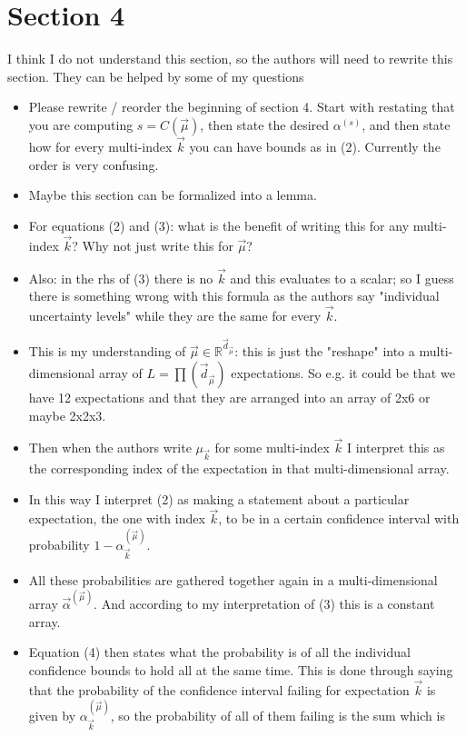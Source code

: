 \documentclass{article}[12pt]
\newcommand{\RefereeTODO}[1]{{\color{red} #1 \newline}}
\begin{document}
\section*{Section 4}

\RefereeTODO{I think I do not understand this section, so the authors will need to rewrite
this section. They can be helped by some of my questions}

\begin{itemize}
    \item \RefereeTODO{Please rewrite / reorder the beginning of section 4. Start with restating that you are computing $s = C(\vec{\mu})$, then state the desired $\alpha^{(s)}$, and then state how for every multi-index $\vec{k}$ you can have bounds as in (2). Currently the order is very confusing.}
    \item \RefereeTODO{Maybe this section can be formalized into a lemma.}
    \item \RefereeTODO{For equations (2) and (3): what is the benefit of writing this for any multi-index $\vec{k}$? Why not just write this for $\vec{\mu}$?}
    \item \RefereeTODO{Also: in the rhs of (3) there is no $\vec{k}$ and this evaluates to a scalar; so I guess there is something wrong with this formula as the authors say "individual uncertainty levels" while they are the same for every $\vec{k}$.}
    \item \RefereeTODO{This is my understanding of $\vec{\mu} \in \mathbb{R}^{\vec{d}_{\vec{\mu}}}$: this is just the "reshape" into a multi-dimensional array of $L = \prod(\vec{d}_{\vec{\mu}})$ expectations. So e.g. it could be that we have 12 expectations and that they are arranged into an array of 2x6 or maybe 2x2x3.}
    \item \RefereeTODO{Then when the authors write $\mu_{\vec{k}}$ for some multi-index $\vec{k}$ I interpret this as the corresponding index of the expectation in that multi-dimensional array.}
    \item \RefereeTODO{In this way I interpret (2) as making a statement about a particular expectation, the one with index $\vec{k}$, to be in a certain confidence interval with probability $1 - \alpha_{\vec{k}}^{(\vec{\mu})}$.}
    \item \RefereeTODO{All these probabilities are gathered together again in a multi-dimensional array $\vec{\alpha}^{(\vec{\mu})}$. And according to my interpretation of (3) this is a constant array.}
    \item \RefereeTODO{Equation (4) then states what the probability is of all the individual confidence bounds to hold all at the same time. This is done through saying that the probability of the confidence interval failing for expectation $\vec{k}$ is given by $\alpha_{\vec{k}}^{(\vec{\mu})}$, so the probability of all of them failing is the sum which is
}
\end{itemize}
\end{document}
